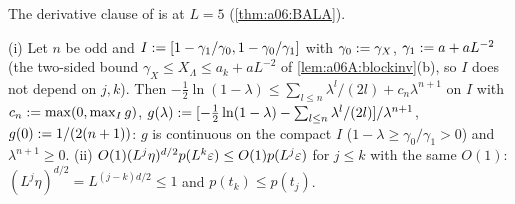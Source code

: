 The derivative clause of \cite[(2.91)]{Ba2} is \cite[Lemma~2.3, (2.60)]{Ba2} at $L=5$ (\cref{thm:a06:BALA}).

\begin{lemma}[{\cite[(2.103), (2.94)]{Ba2}}]\label{lem:a06d:C63}
\textup{(i)} Let $n$ be odd and $I:=[1-\gamma_1/\gamma_0,1-\gamma_0/\gamma_1]$ with $\gamma_0:=\gamma_X$, $\gamma_1:= a+aL^{-2}$ (the two-sided bound $\gamma_X\le X_\Lambda\le a_k+aL^{-2}$ of \cref{lem:a06A:blockinv}(b), so $I$ does not depend on $j,k$). Then $-\frac12\ln(1-\lambda)\le\sum_{l\le n}\lambda^l/(2l)+c_n\lambda^{n+1}$ on $I$ with $c_n:=\max(0,\max_Ig)$, $g(\lambda):=[-\frac12\ln(1-\lambda)-\sum_{l\le n}\lambda^l/(2l)]/\lambda^{n+1}$, $g(0):=1/(2(n+1))$: $g$ is continuous on the compact $I$ ($1-\lambda\ge\gamma_0/\gamma_1>0$) and $\lambda^{n+1}\ge0$. \textup{(ii)} $O(1)(L^j\eta)^{d/2}p(L^k\varepsilon)\le O(1)p(L^j\varepsilon)$ for $j\le k$ with the same $O(1)$: $(L^j\eta)^{d/2}=L^{(j-k)d/2}\le1$ and $p(t_k)\le p(t_j)$.
\end{lemma}
